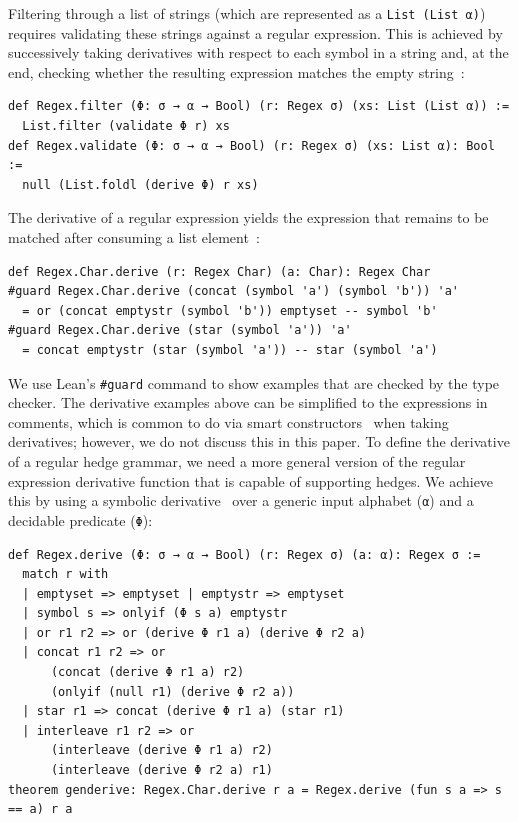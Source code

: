 \documentclass[acmsmall,%
  screen,%
  authorversion, %
  nonacm%
]{acmart}
\begin{document}
Filtering through a list of strings (which are represented as a \lstinline{List (List α)}) requires validating these strings against a regular expression. This is achieved by successively taking derivatives with respect to each symbol in a string and, at the end, checking whether the resulting expression matches the empty string~\cite{brzozowski1964derivatives, reexamined}:
\begin{lstlisting}[label=def Regex.validate]
def Regex.filter (Φ: σ → α → Bool) (r: Regex σ) (xs: List (List α)) :=
  List.filter (validate Φ r) xs
def Regex.validate (Φ: σ → α → Bool) (r: Regex σ) (xs: List α): Bool :=
  null (List.foldl (derive Φ) r xs)
\end{lstlisting}
The derivative of a regular expression yields the expression that remains to be matched after consuming a list element~\cite{brzozowski1964derivatives, reexamined}:
\begin{lstlisting}[label=def Regex.Char.derive]
def Regex.Char.derive (r: Regex Char) (a: Char): Regex Char
#guard Regex.Char.derive (concat (symbol 'a') (symbol 'b')) 'a'
  = or (concat emptystr (symbol 'b')) emptyset -- symbol 'b'
#guard Regex.Char.derive (star (symbol 'a')) 'a'
  = concat emptystr (star (symbol 'a')) -- star (symbol 'a')
\end{lstlisting}
We use Lean's \lstinline{#guard} command to show examples that are checked by the type checker.
The derivative examples above can be simplified to the expressions in comments, which is common to do via smart constructors~\cite{reexamined} when taking derivatives; however, we do not discuss this in this paper.
To define the derivative of a regular hedge grammar, we need a more general version of the regular expression derivative function that is capable of supporting hedges. 
We achieve this by using a symbolic derivative~\cite{stanford2021symbolic, elliott2021symbolic} over a generic input alphabet (\lstinline{α}) and a decidable predicate (\lstinline{Φ}):
\begin{lstlisting}[label=def Regex.derive]
def Regex.derive (Φ: σ → α → Bool) (r: Regex σ) (a: α): Regex σ :=
  match r with
  | emptyset => emptyset | emptystr => emptyset
  | symbol s => onlyif (Φ s a) emptystr
  | or r1 r2 => or (derive Φ r1 a) (derive Φ r2 a)
  | concat r1 r2 => or
      (concat (derive Φ r1 a) r2)
      (onlyif (null r1) (derive Φ r2 a))
  | star r1 => concat (derive Φ r1 a) (star r1)
  | interleave r1 r2 => or
      (interleave (derive Φ r1 a) r2)
      (interleave (derive Φ r2 a) r1)
theorem genderive: Regex.Char.derive r a = Regex.derive (fun s a => s == a) r a
\end{lstlisting}
\end{document}
